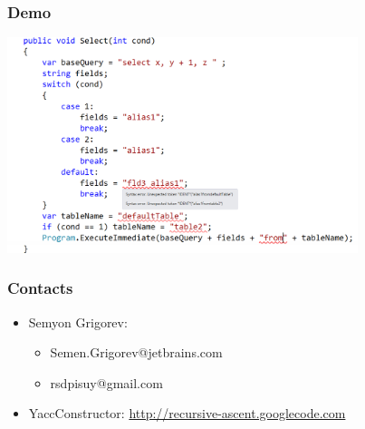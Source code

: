 \documentclass{beamer}
\begin{document}
\begin{frame}[fragile]
	\transwipe[direction=90]
	\frametitle{Demo}
	\begin{center}
	    \includegraphics[width=290pt]{Screen1.png}
	\end{center}
\end{frame}

\begin{frame}
	\transwipe[direction=90]
	\frametitle{Contacts}
	\begin{itemize}
		\item Semyon Grigorev:
		\begin{itemize}
    		\item Semen.Grigorev@jetbrains.com
    		\item rsdpisuy@gmail.com
    	\end{itemize}		
		\item YaccConstructor: \href{http://recursive-ascent.googlecode.com}{http://recursive-ascent.googlecode.com}
	\end{itemize}
\end{frame}
\end{document}
